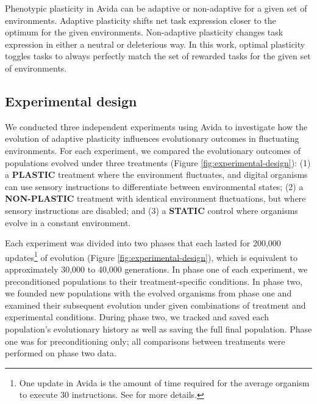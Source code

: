 Phenotypic plasticity in Avida can be adaptive or non-adaptive for a given set of environments.
Adaptive plasticity shifts net task expression closer to the optimum for the given environments.
Non-adaptive plasticity changes task expression in either a neutral or deleterious way. 
In this work, optimal plasticity toggles tasks to always perfectly match the set of rewarded tasks for the given set of environments.

\subsection{Experimental design}
\label{sec:methods:experiment}




We conducted three independent experiments using Avida to investigate how the evolution of adaptive plasticity influences evolutionary outcomes in fluctuating environments.
For each experiment, we compared the evolutionary outcomes of populations evolved under three treatments (Figure \ref{fig:experimental-design}): 
(1) a \textbf{PLASTIC} treatment where the environment fluctuates, and digital organisms can use sensory instructions to differentiate between environmental states;
(2) a \textbf{NON-PLASTIC} treatment with identical environment fluctuations, but where sensory instructions are disabled;
and (3) a \textbf{STATIC} control where organisms evolve in a constant environment.

Each experiment was divided into two phases that each lasted for 200,000 updates\footnote{
    One update in Avida is the amount of time required for the average organism to execute 30 instructions. 
    See \citep{ofria_avida:_2009} for more details.
} of evolution (Figure \ref{fig:experimental-design}), which is equivalent to approximately 30,000 to 40,000 generations.
In phase one of each experiment, we preconditioned populations to their treatment-specific conditions.
In phase two, we founded new populations with the evolved organisms from phase one and examined their subsequent evolution under given combinations of treatment and experimental conditions.
During phase two, we tracked and saved each population's evolutionary history as well as saving the full final population.
Phase one was for preconditioning only; all comparisons between treatments were performed on phase two data.

